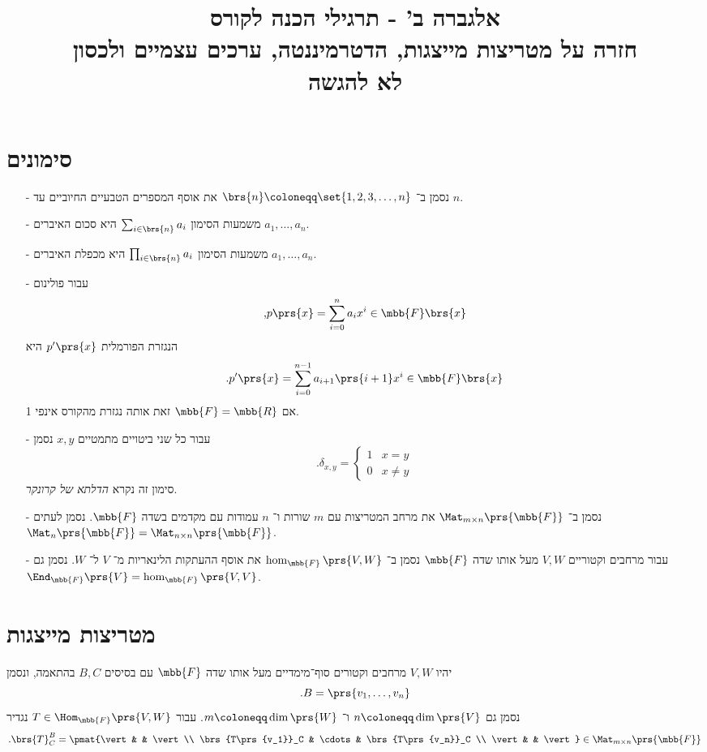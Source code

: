 \documentclass[a4paper,10pt,twoside,openany]{article}
\title{
אלגברה ב' - תרגילי הכנה לקורס \\
חזרה על מטריצות מייצגות, הדטרמיננטה, ערכים עצמיים ולכסון
\\
\vspace{1cm}
\large{לא להגשה}
}
\date{}
\begin{document}
\maketitle

\section*{סימונים}

\begin{itemize}
\item[-]
נסמן ב־%
$\brs{n} \coloneqq \set{1, 2, 3, \ldots, n}$
את אוסף המספרים הטבעיים החיוביים עד
$n$.

\item[-]
משמעות הסימון
$\sum_{i \in \brs{n}} a_i$
היא סכום האיברים
$a_1, \ldots, a_n$.

\item[-]
משמעות הסימון
$\prod_{i \in \brs{n}} a_i$
היא מכפלת האיברים
$a_1, \ldots, a_n$.

\item[-]
עבור פולינום
\[\text{,} p\prs{x} = \sum_{i = 0}^n a_i x^i \in \mbb{F}\brs{x}\]
הנגזרת הפורמלית
$p'\prs{x}$
היא
\[\text{.} p'\prs{x} = \sum_{i=0}^{n-1} a_{i+1} \prs{i+1} x^i \in \mbb{F}\brs{x}\]
אם
$\mbb{F} = \mbb{R}$
זאת אותה נגזרת מהקורס אינפי 1.

\item[-]
עבור כל שני ביטויים מתמטיים
$x,y$
נסמן
\[\text{.}\delta_{x,y} = \begin{cases} 1 & x = y \\ 0 & x \neq y \end{cases}\]
סימון זה נקרא
\emph{הדלתא של קרונקר}.

\item[-]
נסמן ב־%
$\Mat_{m \times n}\prs{\mbb{F}}$
את מרחב המטריצות עם
$m$
שורות ו־%
$n$
עמודות עם מקדמים בשדה
$\mbb{F}$.
נסמן לעתים
$\Mat_{n}\prs{\mbb{F}} = \Mat_{n \times n}\prs{\mbb{F}}$.

\item[-]
עבור מרחבים וקטוריים
$V,W$
מעל אותו שדה
$\mbb{F}$
נסמן ב־%
$\hom_{\mbb{F}}\prs{V,W}$
את אוסף ההעתקות הלינאריות מ־%
$V$
ל־%
$W$.
נסמן גם
$\End_{\mbb{F}}\prs{V} = \hom_{\mbb{F}}\prs{V,V}$.
\end{itemize}

\section{מטריצות מייצגות}

\begin{definition}
יהיו
$V,W$
מרחבים וקטורים סוף־מימדיים מעל אותו שדה
$\mbb{F}$
עם בסיסים
$B,C$
בהתאמה, ונסמן
\[\text{.} B = \prs{v_1, \ldots, v_n}\]
נסמן גם
$n \coloneqq \dim\prs{V}$
ו־%
$m \coloneqq \dim\prs{W}$.
עבור
$T \in \Hom_{\mbb{F}}\prs{V,W}$
נגדיר
\[\text{.} \brs{T}^B_C = \pmat{\vert & & \vert \\ \brs{T\prs{v_1}}_C & \cdots & \brs{T\prs{v_n}}_C \\ \vert & & \vert} \in \Mat_{m \times n}\prs{\mbb{F}}\]
\end{definition}
\end{document}
